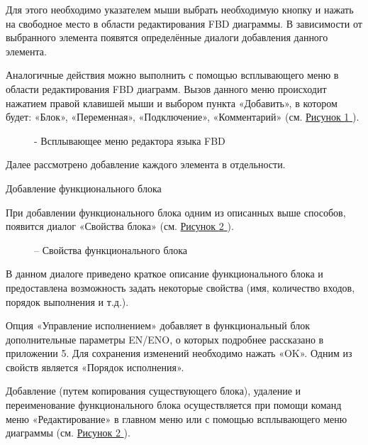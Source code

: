 \documentclass[letterpaper,10pt,russian]{sphinxmanual}
\begin{document}
Для этого необходимо указателем мыши выбрать необходимую кнопку и нажать
на свободное место в области редактирования FBD диаграммы. В зависимости
от выбранного элемента появятся определённые диалоги добавления данного
элемента.

Аналогичные действия можно выполнить с помощью всплывающего меню в
области редактирования FBD диаграмм. Вызов данного меню происходит
нажатием правой клавишей мыши и выбором пункта «Добавить», в котором
будет: «Блок», «Переменная», «Подключение», «Комментарий» (см. \hyperref[usage_guide/ide_components:image60]{Рисунок \ref{usage_guide/ide_components:image60} }).
\begin{figure}[htbp]
\centering
\capstart

\noindent{}
\caption{- Всплывающее меню редактора языка FBD}\label{usage_guide/ide_components:image60}\end{figure}

Далее рассмотрено добавление каждого элемента в отдельности.

Добавление функционального блока

При добавлении функционального блока одним из описанных выше способов,
появится диалог «Свойства блока» (см. \hyperref[usage_guide/ide_components:image61]{Рисунок \ref{usage_guide/ide_components:image61} }).
\begin{figure}[htbp]
\centering
\capstart

\noindent{}
\caption{– Свойства функционального блока}\label{usage_guide/ide_components:image61}\end{figure}

В данном диалоге приведено краткое описание функционального блока и
предоставлена возможность задать некоторые свойства (имя, количество
входов, порядок выполнения и т.д.).

Опция «Управление исполнением» добавляет в функциональный блок
дополнительные параметры EN/ENO, о которых подробнее рассказано в
приложении 5. Для сохранения изменений необходимо нажать «OK». Одним из
свойств является «Порядок исполнения».

Добавление (путем копирования существующего блока), удаление и
переименование функционального блока осуществляется при помощи команд
меню «Редактирование» в главном меню или с помощью всплывающего меню
диаграммы (см. \hyperref[usage_guide/ide_components:image61]{Рисунок \ref{usage_guide/ide_components:image61} }).
\end{document}

